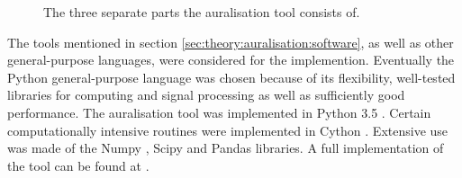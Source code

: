 \begin{figure}[H]
  \centering
{}
  \caption{The three separate parts the auralisation tool consists of.}
  \label{fig:implementation:overview}
\end{figure}

The tools mentioned in section \ref{sec:theory:auralisation:software}, as well as other
general-purpose languages, were considered for the implemention.
Eventually the Python general-purpose language was chosen because of its flexibility,
well-tested libraries for computing and signal processing as well as sufficiently good
performance. The auralisation tool was implemented in Python 3.5 \cite{Python}.
Certain computationally intensive routines were implemented in Cython \cite{Behnel2011,Cython}.
Extensive use was made of the Numpy \cite{VanderWalt2011,Numpy}, Scipy \cite{Scipy} and
Pandas \cite{Mckinney2010} libraries. A full implementation of the tool can be
found at \cite{Rietdijk2017d}.
